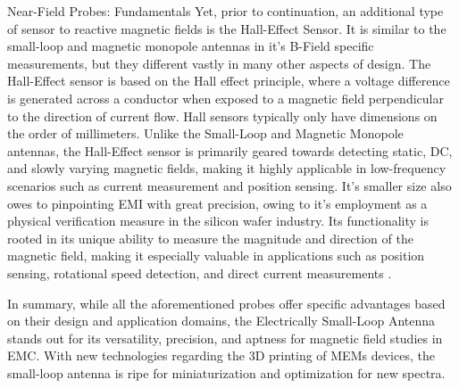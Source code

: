 \documentclass[12pt]{article}
\begin{document}
\begin{section} {Near-Field Probes: Fundamentals}
Yet, prior to continuation, an additional type of sensor to reactive magnetic fields is the Hall-Effect Sensor. It is similar to the small-loop and magnetic monopole antennas in it's B-Field specific measurements, but they different vastly in many other aspects of design.  The Hall-Effect sensor is based on the Hall effect principle, where a voltage difference is generated across a conductor when exposed to a magnetic field perpendicular to the direction of current flow. Hall sensors typically only have dimensions on the order of millimeters. Unlike the Small-Loop and Magnetic Monopole antennas, the Hall-Effect sensor is primarily geared towards detecting static, DC, and slowly varying magnetic fields, making it highly applicable in low-frequency scenarios such as current measurement and position sensing. It's smaller size also owes to pinpointing EMI with great precision, owing to it's employment as a physical verification measure in the silicon wafer industry. Its functionality is rooted in its unique ability to measure the magnitude and direction of the magnetic field, making it especially valuable in applications such as position sensing, rotational speed detection, and direct current measurements \cite{shede_leakage_2017}.

In summary, while all the aforementioned probes offer specific advantages based on their design and application domains, the Electrically Small-Loop Antenna stands out for its versatility, precision, and aptness for magnetic field studies in EMC. With new technologies regarding the 3D printing of MEMs devices, the small-loop antenna is ripe for miniaturization and optimization for new spectra.

\end{section}
\end{document}

